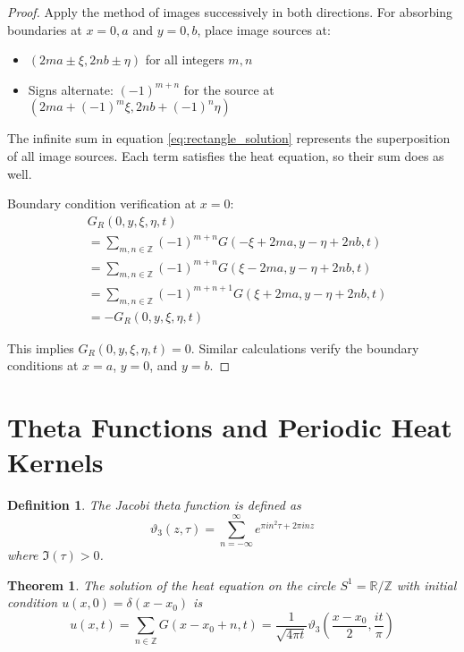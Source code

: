 \documentclass{article}
\newtheorem{theorem}{Theorem}
\newtheorem{definition}{Definition}
\begin{document}
\begin{proof}
Apply the method of images successively in both directions. For absorbing boundaries at $x = 0, a$ and $y = 0, b$, place image sources at:
\begin{itemize}
\item $(2ma \pm \xi, 2nb \pm \eta)$ for all integers $m,n$
\item Signs alternate: $(-1)^{m+n}$ for the source at $(2ma + (-1)^m \xi, 2nb + (-1)^n \eta)$
\end{itemize}

The infinite sum in equation \eqref{eq:rectangle_solution} represents the superposition of all image sources. Each term satisfies the heat equation, so their sum does as well.

Boundary condition verification at $x = 0$:
\begin{align}
&G_R(0,y,\xi,\eta,t) \label{eq:boundary_x_zero}\\
&= \sum_{m,n \in \mathbb{Z}} (-1)^{m+n} G(-\xi+2ma, y-\eta+2nb, t) \label{eq:x_zero_expanded}\\
&= \sum_{m,n \in \mathbb{Z}} (-1)^{m+n} G(\xi-2ma, y-\eta+2nb, t) \label{eq:symmetry_applied}\\
&= \sum_{m,n \in \mathbb{Z}} (-1)^{m+n+1} G(\xi+2ma, y-\eta+2nb, t) \label{eq:index_shift}\\
&= -G_R(0,y,\xi,\eta,t) \label{eq:sign_flip}
\end{align}

This implies $G_R(0,y,\xi,\eta,t) = 0$. Similar calculations verify the boundary conditions at $x = a$, $y = 0$, and $y = b$.
\end{proof}

\section{Theta Functions and Periodic Heat Kernels}

\begin{definition}
The Jacobi theta function is defined as
\begin{equation}
\label{eq:theta_def}
\vartheta_3(z,\tau) = \sum_{n=-\infty}^{\infty} e^{\pi i n^2 \tau + 2\pi i n z}
\end{equation}
where $\Im(\tau) > 0$.
\end{definition}

\begin{theorem}
The solution of the heat equation on the circle $S^1 = \mathbb{R}/\mathbb{Z}$ with initial condition $u(x,0) = \delta(x-x_0)$ is
\begin{equation}
\label{eq:circle_solution}
u(x,t) = \sum_{n \in \mathbb{Z}} G(x - x_0 + n, t) = \frac{1}{\sqrt{4\pi t}} \vartheta_3\left(\frac{x-x_0}{2}, \frac{it}{\pi}\right)
\end{equation}
\end{theorem}
\end{document}
